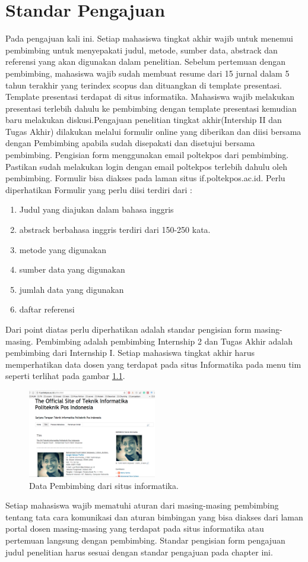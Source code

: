 \chapter{Standar Pengajuan}

Pada pengajuan kali ini. Setiap mahasiswa tingkat akhir wajib untuk menemui pembimbing untuk menyepakati judul, metode, sumber data, abstrack dan referensi yang akan digunakan dalam penelitian. Sebelum pertemuan dengan pembimbing, mahasiswa wajib sudah membuat resume dari 15 jurnal dalam 5 tahun terakhir yang terindex scopus dan dituangkan di template presentasi. Template presentasi terdapat di situs informatika. Mahasiswa wajib melakukan presentasi terlebih dahulu ke pembimbing dengan template presentasi kemudian baru melakukan diskusi.Pengajuan penelitian tingkat akhir(Intership II dan Tugas Akhir) dilakukan melalui formulir online yang diberikan dan diisi bersama dengan Pembimbing apabila sudah disepakati dan disetujui bersama pembimbing. Pengisian form menggunakan email poltekpos dari pembimbing. Pastikan sudah melakukan login dengan email poltekpos terlebih dahulu oleh pembimbing. Formulir bisa diakses pada laman situs if.poltekpos.ac.id. Perlu diperhatikan Formulir yang perlu diisi terdiri dari :
\begin{enumerate}
\item Judul yang diajukan dalam bahasa inggris
\item abstrack berbahasa inggris terdiri dari 150-250 kata.
\item metode yang digunakan
\item sumber data yang digunakan
\item jumlah data yang digunakan
\item daftar referensi
\end{enumerate}
Dari point diatas perlu diperhatikan adalah standar pengisian form masing-masing. Pembimbing adalah pembimbing Internship 2 dan Tugas Akhir adalah pembimbing dari Internship I. Setiap mahasiswa tingkat akhir harus memperhatikan data dosen yang terdapat pada situs Informatika pada menu tim seperti terlihat pada gambar \ref{figure:timif}.
\begin{figure}[ht]
	\centerline{\includegraphics[width=0.5\textwidth]{figures/timif.png}}
	\caption{Data Pembimbing dari situs informatika.}
	\label{figure:timif}
	\end{figure}
Setiap mahasiswa wajib mematuhi aturan dari masing-masing pembimbing tentang tata cara komunikasi dan aturan bimbingan yang bisa diakses dari laman portal dosen masing-masing yang terdapat pada situs informatika atau pertemuan langsung dengan pembimbing. Standar pengisian form pengajuan judul penelitian harus sesuai dengan standar pengajuan pada chapter ini.

